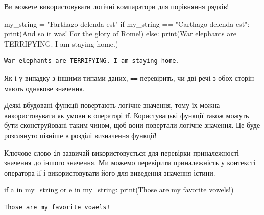 \documentclass[
  letterpaper,
]{report}
\newenvironment{Shaded}{\begin{snugshade}}{\end{snugshade}}
\newcommand{\BuiltInTok}[1]{\textcolor[rgb]{0.00,0.23,0.31}{#1}}
\newcommand{\ControlFlowTok}[1]{\textcolor[rgb]{0.00,0.23,0.31}{#1}}
\newcommand{\KeywordTok}[1]{\textcolor[rgb]{0.00,0.23,0.31}{#1}}
\newcommand{\NormalTok}[1]{\textcolor[rgb]{0.00,0.23,0.31}{#1}}
\newcommand{\OperatorTok}[1]{\textcolor[rgb]{0.37,0.37,0.37}{#1}}
\newcommand{\StringTok}[1]{\textcolor[rgb]{0.13,0.47,0.30}{#1}}
\begin{document}
Ви можете використовувати логічні компаратори для порівняння рядків!

\begin{Shaded}
\begin{Highlighting}[]
\NormalTok{my\_string }\OperatorTok{=} \StringTok{"Farthago delenda est"}
\ControlFlowTok{if}\NormalTok{ my\_string }\OperatorTok{==} \StringTok{"Carthago delenda est"}\NormalTok{:}
    \BuiltInTok{print}\NormalTok{(}\StringTok{\textquotesingle{}And so it was! For the glory of Rome!\textquotesingle{}}\NormalTok{)}
\ControlFlowTok{else}\NormalTok{:}
    \BuiltInTok{print}\NormalTok{(}\StringTok{\textquotesingle{}War elephants are TERRIFYING. I am staying home.\textquotesingle{}}\NormalTok{)}
\end{Highlighting}
\end{Shaded}

\begin{verbatim}
War elephants are TERRIFYING. I am staying home.
\end{verbatim}

Як і у випадку з іншими типами даних, \texttt{==} перевірить, чи дві
речі з обох сторін мають однакове значення.

Деякі вбудовані функції повертають логічне значення, тому їх можна
використовувати як умови в операторі if. Користувацькі функції також
можуть бути сконструйовані таким чином, щоб вони повертали логічне
значення. Це буде розглянуто пізніше в розділі визначення функції!

Ключове слово \texttt{in} зазвичай використовується для перевірки
приналежності значення до іншого значення. Ми можемо перевірити
приналежність у контексті оператора if і використовувати його для
виведення значення істини.

\begin{Shaded}
\begin{Highlighting}[]
\ControlFlowTok{if} \StringTok{\textquotesingle{}a\textquotesingle{}} \KeywordTok{in}\NormalTok{ my\_string }\KeywordTok{or} \StringTok{\textquotesingle{}e\textquotesingle{}} \KeywordTok{in}\NormalTok{ my\_string:}
    \BuiltInTok{print}\NormalTok{(}\StringTok{\textquotesingle{}Those are my favorite vowels!\textquotesingle{}}\NormalTok{)}
\end{Highlighting}
\end{Shaded}

\begin{verbatim}
Those are my favorite vowels!
\end{verbatim}
\end{document}
